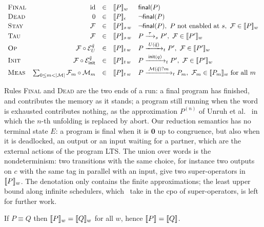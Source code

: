 \begin{table}[ht]
\centering
\footnotesize
$\begin{array}{l@{\quad}rcl@{\quad}l}
\textsc{Final} & \id &\in& \denw{P}{w} & \final(P) \\[2pt]
\textsc{Dead} & 0 &\in& \denw{P}{\epsilon} & \neg\final(P) \\[2pt]
\textsc{Stay} & \sop{F} &\in& \denw{P}{s\,w}
  & \neg\final(P),\ P \text{ not enabled at } s,\ \sop{F} \in \denw{P}{w} \\[2pt]
\textsc{Tau} & \sop{F} &\in& \denw{P}{s\,w}
  & P \step{\tau}{s} P',\ \sop{F} \in \denw{P'}{w} \\[2pt]
\textsc{Op} & \sop{F} \circ \sop{E}_U^{\tilde q} &\in& \denw{P}{t\,w}
  & P \step{\req{U}}{t} P',\ \sop{F} \in \denw{P'}{w} \\[2pt]
\textsc{Init} & \sop{F} \circ \sop{E}_{\mathsf{init}}^{\tilde q} &\in& \denw{P}{t\,w}
  & P \step{\initp}{t} P',\ \sop{F} \in \denw{P'}{w} \\[2pt]
\textsc{Meas} & \sum_{0 \le m < |\M|} \sop{F}_m \circ \sop{M}_m &\in& \denw{P}{t\,w}
  & P \step{\mrecv{m}}{t} P_m,\ \sop{F}_m \in \denw{P_m}{w} \text{ for all } m
\end{array}$
\caption{Denotation of a program under a word of choices.}
\label{tab:den}
\end{table}

\begin{remark}
Rules \textsc{Final} and \textsc{Dead} are the two ends of a run: a final
program has finished, and contributes the memory as it stands; a program still
running when the word is exhausted contributes nothing, as the approximation
$P^{(n)}$ of Unruh et al.~\cite{UVY26} in which the $n$-th unfolding is replaced by abort.
Our reduction semantics has no terminal state $E$: a program is final when it
is $\mathbf{0}$ up to congruence, but also when it is deadlocked, an output or
an input waiting for a partner, which are the external actions of the program
LTS. The union over words is the nondeterminism: two transitions with the
same choice, for instance two outputs on $c$ with the same tag in parallel
with an input, give two super-operators in $\llbracket P \rrbracket_{w}$. The denotation only
contains the finite approximations; the least upper bound along infinite
schedulers, which~\cite{FengXu23,UVY26} take in the cpo of super-operators,
is left for further work.
\end{remark}

\begin{lemma}[Congruence]\label{lem:den-cgr}
If $P \equiv Q$ then $\llbracket P \rrbracket_{w} = \llbracket Q \rrbracket_{w}$ for all $w$, hence
$\llbracket P \rrbracket = \llbracket Q \rrbracket$.
\end{lemma}

